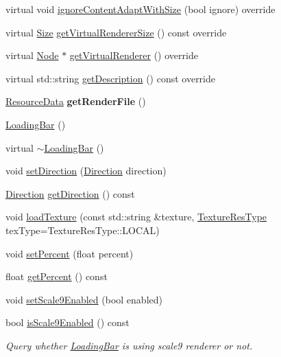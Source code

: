 \begin{DoxyCompactItemize}
virtual void \hyperlink{classui_1_1LoadingBar_a36fd58efdbc7b7e01adab806f2eab6f2}{ignore\+Content\+Adapt\+With\+Size} (bool ignore) override
\item 
virtual \hyperlink{classSize}{Size} \hyperlink{classui_1_1LoadingBar_a10855c54a44cd470286e3243c1cb58a0}{get\+Virtual\+Renderer\+Size} () const override
\item 
virtual \hyperlink{classNode}{Node} $\ast$ \hyperlink{classui_1_1LoadingBar_a20c987a6a4fa0b50cb1ff3cf7cfd17b6}{get\+Virtual\+Renderer} () override
\item 
virtual std\+::string \hyperlink{classui_1_1LoadingBar_afb956804ae7e7b17a5a5810974ca9d99}{get\+Description} () const override
\item 
\mbox{\label{classui_1_1LoadingBar_aeac4dc2b7824321c1f7c31566de63e9d}} 
\hyperlink{structResourceData}{Resource\+Data} {\bfseries get\+Render\+File} ()
\item 
\hyperlink{classui_1_1LoadingBar_a2cb2c133940150cd97088ef50596ce2d}{Loading\+Bar} ()
\item 
virtual \hyperlink{classui_1_1LoadingBar_a5622d30dbfb2da48ddbe01bc08ab4918}{$\sim$\+Loading\+Bar} ()
\item 
void \hyperlink{classui_1_1LoadingBar_a66c628ef4dd8a717f7a5fad13f9306a9}{set\+Direction} (\hyperlink{classui_1_1LoadingBar_a4407b3ce72891a78755e25d765e25063}{Direction} direction)
\item 
\hyperlink{classui_1_1LoadingBar_a4407b3ce72891a78755e25d765e25063}{Direction} \hyperlink{classui_1_1LoadingBar_a18a37f835549480ff0cf0ce2fde8b8dc}{get\+Direction} () const
\item 
void \hyperlink{classui_1_1LoadingBar_a72f581d7571f9e592ae91a73657a4862}{load\+Texture} (const std\+::string \&texture, \hyperlink{classui_1_1Widget_a040a65ec5ad3b11119b7e16b98bd9af0}{Texture\+Res\+Type} tex\+Type=Texture\+Res\+Type\+::\+L\+O\+C\+AL)
\item 
void \hyperlink{classui_1_1LoadingBar_ad26d11482f885dab57b56885bfed52d3}{set\+Percent} (float percent)
\item 
float \hyperlink{classui_1_1LoadingBar_a8a0ce53c7f26ef008cd31873eea7889b}{get\+Percent} () const
\item 
void \hyperlink{classui_1_1LoadingBar_adbc9e1eb4d8bb1881d37506443f1ee6d}{set\+Scale9\+Enabled} (bool enabled)
\item 
bool \hyperlink{classui_1_1LoadingBar_ad7069c89d7947232a990799256ebabf2}{is\+Scale9\+Enabled} () const
\begin{DoxyCompactList}\small\item\em Query whether \hyperlink{classui_1_1LoadingBar}{Loading\+Bar} is using scale9 renderer or not. \end{DoxyCompactList}\item 

\end{DoxyCompactItemize}
